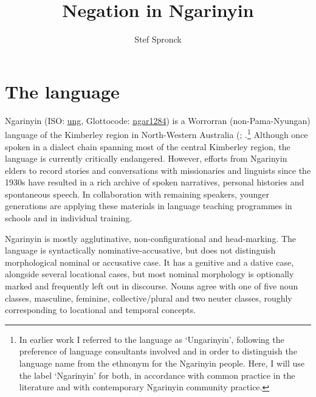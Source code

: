\documentclass[output=paper,colorlinks,citecolor=brown]{langscibook}
\author{Stef Spronck\affiliation{University of Amsterdam; University of Helsinki}}
\title{Negation in Ngarinyin}
\begin{document}
\maketitle

\section{The language} \label{SecIntroNgarinyin}


Ngarinyin (ISO: \href{https://iso639-3.sil.org/code/ung}{ung}, Glottocode: \href{https://glottolog.org/resource/languoid/id/ngar1284}{ngar1284}) is a Worrorran (non-Pama-Nyungan) language of the Kimberley region in North-Western Australia (\citealt{Rumsey1982}; \citealt{Spronck2015}.\footnote{In earlier work I referred to the language as `Ungarinyin', following the preference of language consultants involved and in order to distinguish the language name from the ethnonym for the Ngarinyin people. Here, I will use the label `Ngarinyin' for both, in accordance with common practice in the literature and with contemporary Ngarinyin community practice.} Although once spoken in a dialect chain spanning most of the central Kimberley region, the language is currently critically endangered. However, efforts from Ngarinyin elders to record stories and conversations with missionaries and linguists since the 1930s have resulted in a rich archive of spoken narratives, personal histories and spontaneous speech. In collaboration with remaining speakers, younger generations are applying these materials in language teaching programmes in schools and in individual training.

Ngarinyin is mostly agglutinative, non-configurational and head-marking. The language is syntactically nominative-accusative, but does not distinguish morphological nominal or accusative case. It has a genitive and a dative case, alongside several locational cases, but most nominal morphology is optionally marked and frequently left out in discourse. Nouns agree with one of five noun classes, masculine, feminine, collective/plural and two neuter classes, roughly corresponding to locational and temporal concepts.
\end{document}
